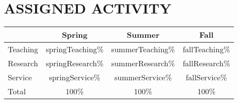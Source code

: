\section{ASSIGNED ACTIVITY}
\begin{center}
\begin{tabular}{lccc}


& Spring & Summer & Fall 
 
\\
\hline
Teaching 
& {{springTeaching}}\%  & {{summerTeaching}}\% & {{fallTeaching}}\%

\\
Research 
& {{springResearch}}\% & {{summerResearch}}\% & {{fallResearch}}\%

\\
Service
& {{springService}}\% & {{summerService}}\% & {{fallService}}\%   

\\
\hline
Total & 100\% & 100\% & 100\%

\end{tabular}
\end{center}
